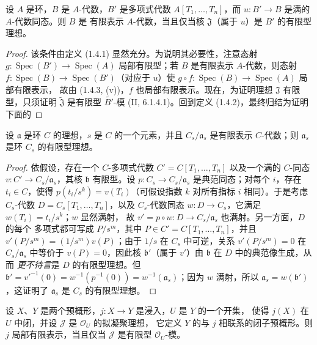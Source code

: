 \begin{proposition}[1.4.4]
\label{IV.1.4.4-fr}
设 $A$ 是环，$B$ 是 $A$-代数，$B'$ 是多项式代数
$A[T_1,\ldots,T_n]$，而 $u:B'\to B$ 是满的 $A$-代数同态。则 $B$ 是
有限表示 $A$-代数，当且仅当核 $\mathfrak J$（属于 $u$）是 $B'$ 的有限型理想。
\end{proposition}

\begin{proof}
该条件由定义 (1.4.1) 显然充分。为说明其必要性，注意态射
$g:\operatorname{Spec}(B')\to\operatorname{Spec}(A)$ 局部有限型；若 $B$
是有限表示 $A$-代数，则态射
$f:\operatorname{Spec}(B)\to\operatorname{Spec}(B')$（对应于 $u$）使
$g\circ f:\operatorname{Spec}(B)\to\operatorname{Spec}(A)$ 局部有限表示，
故由 (1.4.3, (v))，$f$ 也局部有限表示。现在，为证明理想 $\mathfrak J$
有限型，只须证明 $\widetilde{\mathfrak J}$ 是有限型
$\widetilde{B'}$-模 (II, 6.1.4.1)。回到定义 (1.4.2)，最终归结为证明下面的
\end{proof}

\begin{lemma}[1.4.4.1]
\label{IV.1.4.4.1-fr}
设 $\mathfrak a$ 是环 $C$ 的理想，$s$ 是 $C$ 的一个元素，并且
$C_s/\mathfrak a_s$ 是有限表示 $C$-代数；则 $\mathfrak a_s$ 是环
$C_s$ 的有限型理想。
\end{lemma}

\begin{proof}
依假设，存在一个 $C$-多项式代数
$C'=C[T_1,\ldots,T_n]$ 以及一个满的 $C$-同态
$v:C'\to C_s/\mathfrak a_s$，其核 $\mathfrak b$ 有限型。设
$p:C_s\to C_s/\mathfrak a_s$ 是典范同态；对每个 $i$，存在
$t_i\in C$，使得 $p(t_i/s^k)=v(T_i)$（可假设指数 $k$ 对所有指标
$i$ 相同）。于是考虑 $C_s$-代数 $D=C_s[T_1,\ldots,T_n]$，以及
$C_s$-代数同态 $w:D\to C_s$，它满足 $w(T_i)=t_i/s^k$；$w$ 显然满射，
故 $v'=p\circ w:D\to C_s/\mathfrak a_s$ 也满射。另一方面，$D$ 的每个
多项式都可写成 $P/s^m$，其中 $P\in C'=C[T_1,\ldots,T_n]$，并且
$v'(P/s^m)=(1/s^m)v(P)$；由于 $1/s$ 在 $C_s$ 中可逆，关系
$v'(P/s^m)=0$ 在 $C_s/\mathfrak a_s$ 中等价于 $v(P)=0$，因此核
$\mathfrak b'$（属于 $v'$）由 $\mathfrak b$ 在 $D$ 中的典范像生成，从而
\emph{更不待言}是 $D$ 的有限型理想。但
$\mathfrak b'=v'^{-1}(0)=w^{-1}(p^{-1}(0))=w^{-1}(\mathfrak a_s)$；因为
$w$ 满射，所以 $\mathfrak a_s=w(\mathfrak b')$，这证明了 $\mathfrak a_s$
是 $C_s$ 的有限型理想。
\end{proof}

\begin{corollary}[1.4.5]
\label{IV.1.4.5-fr}
设 $X$、$Y$ 是两个预概形，$j:X\to Y$ 是浸入，$U$ 是 $Y$ 的一个开集，
使得 $j(X)$ 在 $U$ 中闭，并设 $\mathcal J$ 是 $\mathcal O_U$ 的拟凝聚理想，
它定义 $Y$ 的与 $j$ 相联系的闭子预概形。则 $j$ 局部有限表示，当且仅当
$\mathcal J$ 是有限型 $\mathcal O_U$-模。
\end{corollary}

